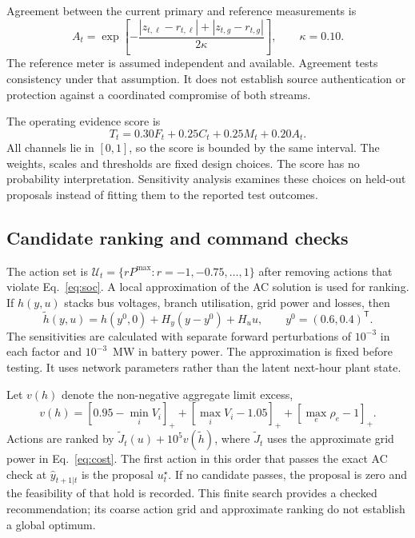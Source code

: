\documentclass[11pt,a4paper]{article}
\newcommand{\pos}[1]{[#1]_{+}}
\begin{document}
Agreement between the current primary and reference measurements is
\begin{equation}
A_t=\exp\left[-\frac{|z_{t,\ell}-r_{t,\ell}|+|z_{t,g}-r_{t,g}|}{2\kappa}\right],\qquad\kappa=0.10.
\label{eq:agreement}
\end{equation}
The reference meter is assumed independent and available. Agreement tests consistency under that assumption. It does not establish source authentication or protection against a coordinated compromise of both streams.

The operating evidence score is
\begin{equation}
T_t=0.30F_t+0.25C_t+0.25M_t+0.20A_t.\label{eq:trust}
\end{equation}
All channels lie in $[0,1]$, so the score is bounded by the same interval. The weights, scales and thresholds are fixed design choices. The score has no probability interpretation. Sensitivity analysis examines these choices on held-out proposals instead of fitting them to the reported test outcomes.

\subsection{Candidate ranking and command checks}
The action set is $\mathcal U_t=\{rP^{\max}:r=-1,-0.75,\ldots,1\}$ after removing actions that violate Eq.~\eqref{eq:soc}. A local approximation of the AC solution is used for ranking. If $h(y,u)$ stacks bus voltages, branch utilisation, grid power and losses, then
\begin{equation}
\widetilde h(y,u)=h(y^0,0)+H_y(y-y^0)+H_u u,\qquad y^0=(0.6,0.4)^{\mathsf T}.\label{eq:linear}
\end{equation}
The sensitivities are calculated with separate forward perturbations of $10^{-3}$ in each factor and $10^{-3}$~MW in battery power. The approximation is fixed before testing. It uses network parameters rather than the latent next-hour plant state.

Let $v(h)$ denote the non-negative aggregate limit excess,
\begin{equation}
v(h)=\pos{0.95-\min_i V_i}+\pos{\max_i V_i-1.05}
+\pos{\max_e\rho_e-1}.\label{eq:severity}
\end{equation}
Actions are ranked by $\widetilde J_t(u)+10^5v(\widetilde h)$, where $\widetilde J_t$ uses the approximate grid power in Eq.~\eqref{eq:cost}. The first action in this order that passes the exact AC check at $\widehat y_{t+1|t}$ is the proposal $u_t^\star$. If no candidate passes, the proposal is zero and the feasibility of that hold is recorded. This finite search provides a checked recommendation; its coarse action grid and approximate ranking do not establish a global optimum.
\end{document}
